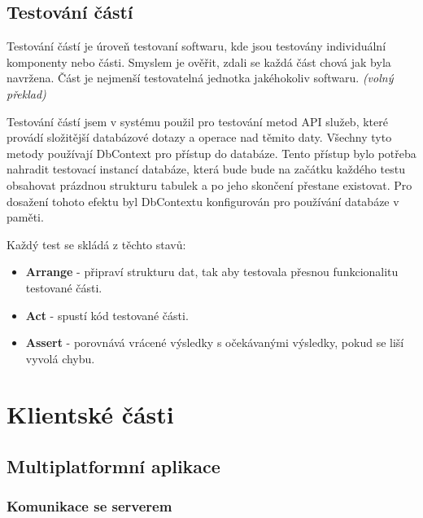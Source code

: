 \documentclass[
  biblatex,
  glossaries,
  index
]{kidiplom}
\begin{document}
\subsection{Testování částí}
Testování částí je úroveň testovaní softwaru, kde jsou testovány individuální komponenty nebo části. Smyslem je ověřit, zdali se každá část chová jak byla navržena. Část je nejmenší testovatelná jednotka jakéhokoliv softwaru.\cite{11} \textit{(volný překlad)}

Testování částí jsem v systému použil pro testování metod API služeb, které provádí složitější databázové dotazy a operace nad těmito daty. Všechny tyto metody používají DbContext pro přístup do databáze. Tento přístup bylo potřeba nahradit testovací instancí databáze, která bude bude na začátku každého testu obsahovat prázdnou strukturu tabulek a po jeho skončení přestane existovat. Pro dosažení tohoto efektu byl DbContextu konfigurován pro používání databáze v paměti.

Každý test se skládá z těchto stavů: 
\begin{itemize}
	\item \textbf{Arrange} - připraví strukturu dat, tak aby testovala přesnou funkcionalitu testované části.
	\item \textbf{Act} - spustí kód testované části.
	\item \textbf{Assert} - porovnává vrácené výsledky s očekávanými výsledky, pokud se liší vyvolá chybu.
\end{itemize}

\newpage

\section{Klientské části}

\subsection{Multiplatformní aplikace}

\subsubsection{Komunikace se serverem}

\end{document}
